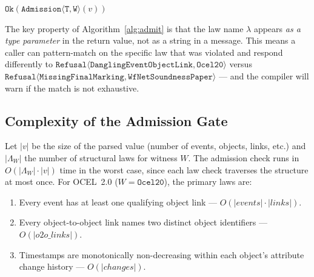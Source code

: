 \begin{algorithm}[H]
\caption{Structural Admission Gate (\texttt{Admit::admit})}
\label{alg:admit}
\DontPrintSemicolon
{}
\BlankLine
{}
\Return $\mathtt{Ok}(\mathtt{Admission\langle T, W\rangle}(v))$\;
\end{algorithm}

The key property of Algorithm~\ref{alg:admit} is that the law name $\lambda$
appears \emph{as a type parameter} in the return value, not as a string in a
message. This means a caller can pattern-match on the specific law that was
violated and respond differently to
$\mathtt{Refusal\langle DanglingEventObjectLink, Ocel20\rangle}$ versus
$\mathtt{Refusal\langle MissingFinalMarking, WfNetSoundnessPaper\rangle}$
--- and the compiler will warn if the match is not exhaustive.

\subsection{Complexity of the Admission Gate}

Let $|v|$ be the size of the parsed value (number of events, objects, links,
etc.) and $|\Lambda_W|$ the number of structural laws for witness $W$. The
admission check runs in $O(|\Lambda_W| \cdot |v|)$ time in the worst case,
since each law check traverses the structure at most once. For OCEL~2.0
($W = \mathtt{Ocel20}$), the primary laws are:

\begin{enumerate}
  \item Every event has at least one qualifying object link ---
    $O(|\mathit{events}| \cdot |\mathit{links}|)$.
  \item Every object-to-object link names two distinct object identifiers ---
    $O(|\mathit{o2o\_links}|)$.
  \item Timestamps are monotonically non-decreasing within each object's
    attribute change history --- $O(|\mathit{changes}|)$.
\end{enumerate}

